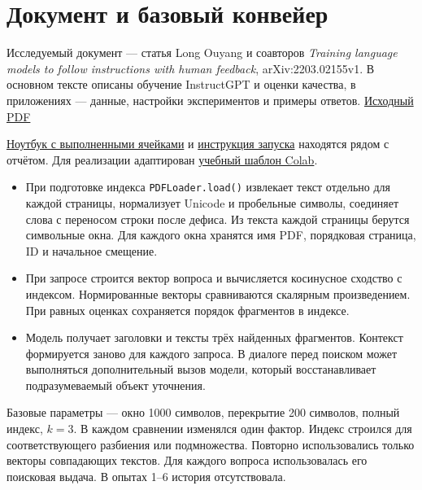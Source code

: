 \documentclass[12pt,a4paper]{article}
\providecommand{\tightlist}{\setlength{\itemsep}{0pt}\setlength{\parskip}{0pt}}
\begin{document}
\hypertarget{ux434ux43eux43aux443ux43cux435ux43dux442-ux438-ux431ux430ux437ux43eux432ux44bux439-ux43aux43eux43dux432ux435ux439ux435ux440}{%
\section{Документ и базовый
конвейер}\label{ux434ux43eux43aux443ux43cux435ux43dux442-ux438-ux431ux430ux437ux43eux432ux44bux439-ux43aux43eux43dux432ux435ux439ux435ux440}}

Исследуемый документ --- статья Long Ouyang и соавторов \emph{Training
language models to follow instructions with human feedback},
arXiv:2203.02155v1. В основном тексте описаны обучение InstructGPT и
оценки качества, в приложениях --- данные, настройки экспериментов и
примеры ответов. \href{data/LLM\%20instruct\%20\%282\%29.pdf}{Исходный
PDF}

\href{rag_lab.ipynb}{Ноутбук с выполненными ячейками} и
\href{README.md}{инструкция запуска} находятся рядом с отчётом. Для
реализации адаптирован
\href{https://colab.research.google.com/drive/17Wcx3SEeMSfzIa3xvE_r8Egmv3S21UFS}{учебный
шаблон Colab}.

\begin{itemize}
\tightlist
\item
  При подготовке индекса \texttt{PDFLoader.load()} извлекает текст
  отдельно для каждой страницы, нормализует Unicode и пробельные
  символы, соединяет слова с переносом строки после дефиса. Из текста
  каждой страницы берутся символьные окна. Для каждого окна хранятся имя
  PDF, порядковая страница, ID и начальное смещение.
\item
  При запросе строится вектор вопроса и вычисляется косинусное сходство
  с индексом. Нормированные векторы сравниваются скалярным
  произведением. При равных оценках сохраняется порядок фрагментов в
  индексе.
\item
  Модель получает заголовки и тексты трёх найденных фрагментов. Контекст
  формируется заново для каждого запроса. В диалоге перед поиском может
  выполняться дополнительный вызов модели, который восстанавливает
  подразумеваемый объект уточнения.
\end{itemize}

Базовые параметры --- окно 1000 символов, перекрытие 200 символов,
полный индекс, \(k=3\). В каждом сравнении изменялся один фактор. Индекс
строился для соответствующего разбиения или подмножества. Повторно
использовались только векторы совпадающих текстов. Для каждого вопроса
использовалась его поисковая выдача. В опытах 1--6 история
отсутствовала.
\end{document}
